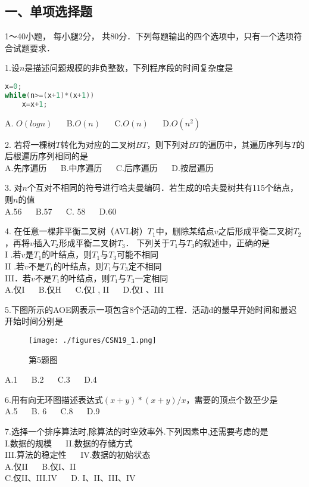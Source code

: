 
\subsection{一、单项选择题}
1～40小题， 每小腿2分， 共80分．下列每题输出的四个选项中，只有一个选项符合试题要求．

1.设$n$是描述问题规模的非负整数，下列程序段的时间复杂度是
\begin{lstlisting}[language=cpp]
x=0;
while(n>=(x+1)*(x+1))
    x=x+1;
\end{lstlisting}
A. $O(logn)$  $\quad$  B.$O(n)$  $\quad$   C.$O(n)$  $\quad$  D.$O(n^2)$

2. 若将一棵树$T$转化为对应的二叉树$BT$，则下列对$BT$的遍历中，其遍历序列与$T$的后根遍历序列相同的是 \\
A.先序遍历  $\quad$  B.中序遍历  $\quad$  C.后序遍历  $\quad$ D.按层遍历

3. 对$n$个互对不相同的符号进行哈夫曼编码．若生成的哈夫曼树共有115个结点，则$n$的值 \\
A.56  $\quad$  B.57  $\quad$  C. 58  $\quad$  D.60

4. 在任意一棵非平衡二叉树（AVL树）$T_1$中，删除某结点$v$之后形成平衡二叉树$T_2$，再将$v$插入$T_2$形成平衡二叉树$T_3$． 下列关于$T_1$与$T_3$的叙述中，正确的是 \\
I .若$v$是$T_1$的叶结点，则$T_1$与$T_3$可能不相同 \\
II .若$v$不是$T_1$的叶结点，则$T_1$与$T_3$定不相同  \\
III．若$v$不是$T_1$的叶结点，则$T_1$与$T_3$一定相同 \\
A.仅I  $\quad$  B.仅H  $\quad$ C.仅I , II  $\quad$  D.仅I 、III

5.下图所示的AOE网表示一项包含8个活动的工程．活动d的最早开始时间和最迟开始时间分别是
\begin{figure}[ht]
\centering
\texttt{[image: ./figures/CSN19\_1.png]}
\caption{第5题图} \label{CSN19_fig1}
\end{figure}
A.1  $\quad$  B.2  $\quad$  C.3  $\quad$  D.4

6.用有向无环图描述表达式$(x+y)*(x+y)/x$，需要的顶点个数至少是 \\
A.5  $\quad$  B. 6  $\quad$  C.8  $\quad$  D.9

7.选择一个排序算法时,除算法的时空效率外.下列因素中,还需要考虑的是 \\
I.数据的规模 $\quad$ II.数据的存储方式 \\
III.算法的稳定性 $\quad$ IV.数据的初始状态 \\
A.仅II $\quad$ B.仅I、II \\
C.仅II、III.IV $\quad$ D. I、II、III、IV

